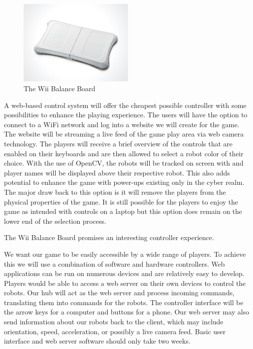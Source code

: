\documentclass[11pt]{ieeeconf}
\begin{document}
\begin{figure}[H]
\centering
\captionsetup{justification=centering}
\includegraphics[width=0.5\textwidth]{images/wii.jpg}
\caption{The Wii Balance Board}
\label{Wii}
\end{figure}

A web-based control system will offer the cheapest possible controller with some possibilities to enhance the playing experience. The users will have the option to connect to a WiFi network and log into a website we will create for the game. The website will be streaming a live feed of the game play area via web camera technology. The players will receive a brief overview of the controls that are enabled on their keyboards and are then allowed to select a robot color of their choice. With the use of OpenCV, the robots will be tracked on screen with and player names will be displayed above their respective robot. This also adds potential to enhance the game with power-ups existing only in the cyber realm. The major draw back to this option is it will remove the players from the physical properties of the game. It is still possible for the players to enjoy the game as intended with controls on a laptop but this option does remain on the lower end of the selection process. 

The Wii Balance Board promises an interesting controller experience. 

We want our game to be easily accessible by a wide range of players. To achieve this we will use a combination of software and hardware controllers. Web applications can be run on numerous devices and are relatively easy to develop. Players would be able to access a web server on their own devices to control the robots. Our hub will act as the web server and process incoming commands, translating them into commands for the robots. The controller interface will be the arrow keys for a computer and buttons for a phone. Our web server may also send information about our robots back to the client, which may include orientation, speed, acceleration, or possibly a live camera feed. Basic user interface and web server software should only take two weeks.
\end{document}
